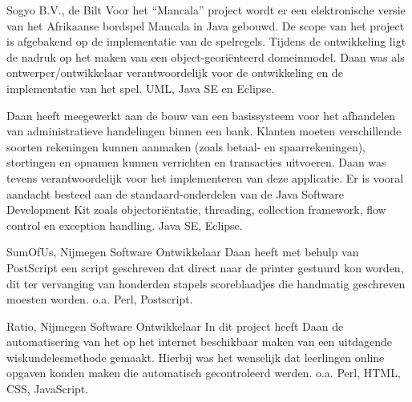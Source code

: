 \begin{workExperience}{Sogyo B.V., de Bilt}
		Voor het ``Mancala'' project wordt er een elektronische versie van het
		Afrikaanse bordspel Mancala in Java gebouwd. De scope van het
		project is afgebakend op de implementatie van de spelregels. Tijdens
		de ontwikkeling ligt de nadruk op het maken van een
		object-geori\"enteerd domeinmodel. Daan was als ontwerper/ontwikkelaar
		verantwoordelijk voor de ontwikkeling en de implementatie van het
		spel.
		\technics UML, Java SE en Eclipse.
		
		Daan heeft meegewerkt aan de bouw van een basissysteem voor het
		afhandelen van administratieve handelingen binnen een bank. Klanten
		moeten verschillende soorten rekeningen kunnen aanmaken (zoals betaal-
		en spaarrekeningen), stortingen en opnamen kunnen verrichten en
		transacties uitvoeren. Daan was tevens verantwoordelijk voor het
		implementeren van deze applicatie.
		Er is vooral aandacht besteed aan de standaard-onderdelen van de Java
		Software Development Kit zoals objectori\"entatie, threading, collection
		framework, flow control en exception handling.
		\technics Java SE, Eclipse.
	\end{workExperience}
	
	\begin{workExperience}{SumOfUs, Nijmegen}%
	{Software Ontwikkelaar}%
	{}
		Daan heeft met behulp van PostScript een script geschreven dat direct
		naar de printer gestuurd kon worden, dit ter vervanging van honderden
		stapels scoreblaadjes die handmatig geschreven moesten worden.
		\technics o.a. Perl, Postscript.
	\end{workExperience}

	\begin{workExperience}{Ratio, Nijmegen}%
	{Software Ontwikkelaar}%
	{}
		In dit project heeft Daan de automatisering van het op het internet
		beschikbaar maken van een uitdagende wiskundelesmethode gemaakt. Hierbij
		was het wenselijk dat leerlingen online opgaven konden maken die
		automatisch gecontroleerd werden.
		\technics o.a. Perl, HTML, CSS, JavaScript.	
	\end{workExperience}

